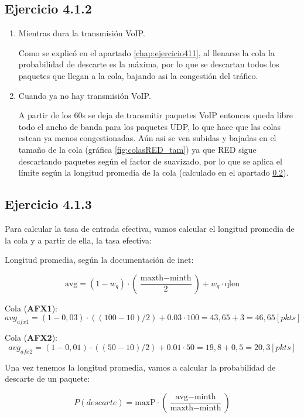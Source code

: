 \subsection{Ejercicio 4.1.2}
\begin{enumerate}
    \item Mientras dura la transmisión VoIP.
    
    Como se explicó en el apartado \ref{chap:ejercicio411}, al llenarse la cola la probabilidad de descarte es la máxima, por lo que se descartan
    todos los paquetes que llegan a la cola, bajando asi la congestión del tráfico.      

    \item Cuando ya no hay transmisión VoIP.
    
    A partir de los 60s se deja de transmitir paquetes VoIP entonces queda libre todo el ancho de banda para los paquetes UDP, 
    lo que hace que las colas estean ya menos congestionadas. Aún asi se ven subidas y bajadas en el tamaño de la cola (gráfica \ref{fig:colasRED_tam}) 
    ya que RED sigue descartando paquetes según el factor de suavizado, por lo que se aplica el límite según la longitud promedia de la cola (calculado en 
    el apartado \ref{text:calculos}).
    


\end{enumerate}

\subsection{Ejercicio 4.1.3} \label{text:calculos}

Para calcular la tasa de entrada efectiva, vamos calcular el longitud promedia de la cola y a partir de ella, la tasa efectiva:

Longitud promedia, según la documentación de inet:

\[
\text{avg} = (1 - w_q) \cdot \left(\frac{\text{maxth} - \text{minth}}{2}\right) + w_q \cdot \text{qlen}
\]

Cola (\textbf{AFX1}):
\[
 avg_{afx1} = (1-0,03) \cdot \left((100-10)/2\right) + 0.03 \cdot 100 = 43,65 + 3 = 46,65 [pkts]
\]

Cola (\textbf{AFX2}):
\[
 avg_{afx2} = (1-0,01) \cdot \left((50-10)/2\right) + 0.01 \cdot 50 = 19,8 + 0,5 = 20,3 [pkts]
\]

Una vez tenemos la longitud promedia, vamos a calcular la probabilidad de descarte de un paquete:

\[
P(descarte) = \text{maxP} \cdot \left(\frac{\text{avg} - \text{minth}}{\text{maxth} - \text{minth}}\right)
\]

